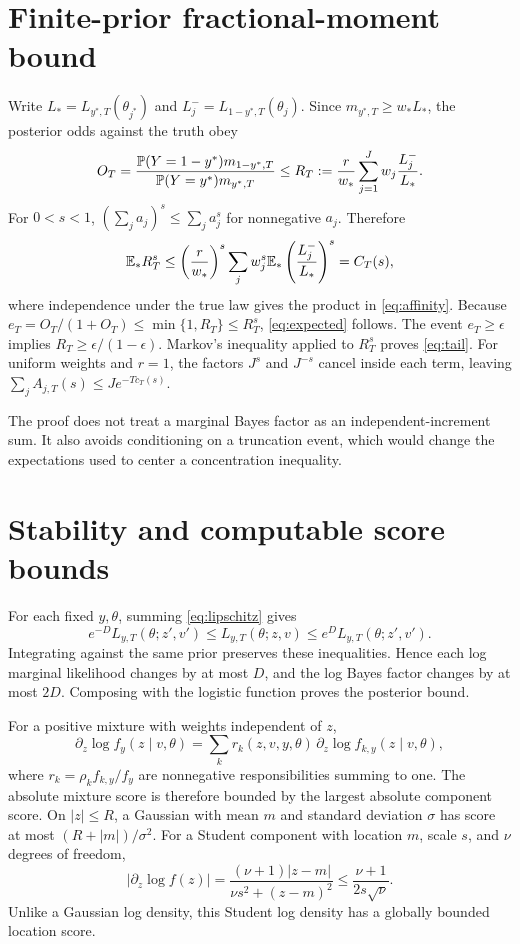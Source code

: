 \section{Finite-prior fractional-moment bound}
\label{app:finite}
Write $L_*=L_{y^*,T}(\theta_{j^*})$ and $L_j^-=L_{1-y^*,T}(\theta_j)$. Since $m_{y^*,T}\geq w_*L_*$, the posterior odds against the truth obey
\[
 O_T=\frac{\mathbb P(Y=1-y^*)m_{1-y^*,T}}{\mathbb P(Y=y^*)m_{y^*,T}}
 \leq R_T:=\frac r{w_*}\sum_{j=1}^Jw_j\frac{L_j^-}{L_*}.
\]
For $0<s<1$, $(\sum_j a_j)^s\leq\sum_j a_j^s$ for nonnegative $a_j$. Therefore
\[
 \mathbb E_*R_T^s\leq\left(\frac r{w_*}\right)^s
 \sum_jw_j^s\mathbb E_*\left(\frac{L_j^-}{L_*}\right)^s
 =C_T(s),
\]
where independence under the true law gives the product in \eqref{eq:affinity}. Because
$e_T=O_T/(1+O_T)\leq\min\{1,R_T\}\leq R_T^s$,
\eqref{eq:expected} follows. The event $e_T\geq\epsilon$ implies
$R_T\geq\epsilon/(1-\epsilon)$. Markov's inequality applied to $R_T^s$ proves \eqref{eq:tail}. For uniform weights and $r=1$, the factors $J^s$ and $J^{-s}$ cancel inside each term, leaving $\sum_j A_{j,T}(s)\leq J e^{-Tc_T(s)}$.

The proof does not treat a marginal Bayes factor as an independent-increment sum. It also avoids conditioning on a truncation event, which would change the expectations used to center a concentration inequality.

\section{Stability and computable score bounds}
\label{app:stability}
For each fixed $y,\theta$, summing \eqref{eq:lipschitz} gives
\[
 e^{-D}L_{y,T}(\theta;z',v')\leq L_{y,T}(\theta;z,v)
 \leq e^D L_{y,T}(\theta;z',v').
\]
Integrating against the same prior preserves these inequalities. Hence each log marginal likelihood changes by at most $D$, and the log Bayes factor changes by at most $2D$. Composing with the logistic function proves the posterior bound.

For a positive mixture with weights independent of $z$,
\[
 \partial_z\log f_y(z\mid v,\theta)
 =\sum_k r_k(z,v,y,\theta)\,\partial_z\log f_{k,y}(z\mid v,\theta),
\]
where $r_k=\rho_kf_{k,y}/f_y$ are nonnegative responsibilities summing to one. The absolute mixture score is therefore bounded by the largest absolute component score. On $|z|\leq R$, a Gaussian with mean $m$ and standard deviation $\sigma$ has score at most $(R+|m|)/\sigma^2$. For a Student component with location $m$, scale $s$, and $\nu$ degrees of freedom,
\[
 \left|\partial_z\log f(z)\right|
 =\frac{(\nu+1)|z-m|}{\nu s^2+(z-m)^2}
 \leq\frac{\nu+1}{2s\sqrt\nu}.
\]
Unlike a Gaussian log density, this Student log density has a globally bounded location score.

